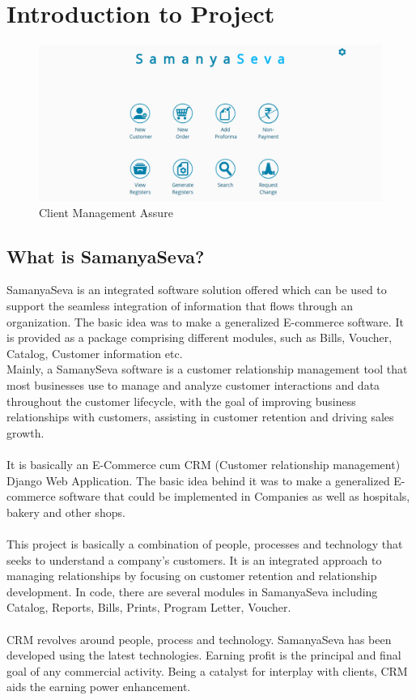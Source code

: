 \section{Introduction to Project}
\begin{figure}[!ht]
\centering
\includegraphics[scale=0.41]{input/images/samanya1.png}                   
\caption{Client Management Assure}
\hspace{-1.5em}
\end{figure}
\subsection{What is SamanyaSeva?}
 SamanyaSeva is an integrated software solution offered which can be used to support the seamless integration of information that flows through an organization. The basic idea was to make a generalized E-commerce software. It is provided as a package comprising different modules, such as Bills, Voucher, Catalog, Customer information etc.\\
 Mainly, a SamanySeva software is a customer relationship management tool that most businesses use to manage and analyze customer interactions and data throughout the customer lifecycle, with the goal of improving business relationships with customers, assisting in customer retention and driving sales growth.\\\\
It is basically an E-Commerce cum CRM (Customer relationship management) Django Web Application.
The basic idea behind it was to make a generalized E-commerce software that could be implemented in Companies as well as hospitals, bakery and other shops.\\\\
This project is basically a combination of people, processes and technology that seeks to understand a company's customers. It is an integrated approach to managing relationships by focusing on customer retention and relationship development. In code, there are several modules in SamanyaSeva including Catalog, Reports, Bills, Prints, Program Letter, Voucher.\\\\
CRM revolves around people, process and technology. SamanyaSeva has been developed using the latest technologies. Earning profit is the principal and final goal of any commercial activity. Being a catalyst for interplay with clients, CRM aids the earning power enhancement. 

